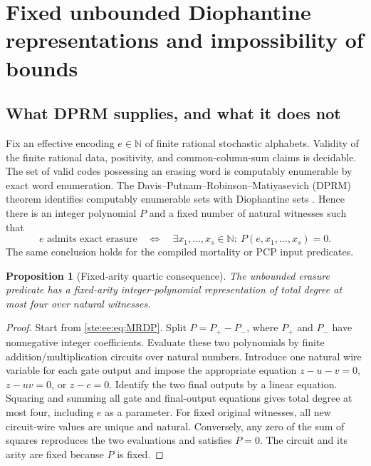 \documentclass[11pt,letterpaper]{article}
\newtheorem{proposition}[theorem]{Proposition}
\theoremstyle{definition}
\theoremstyle{remark}
\newcommand{\N}{\mathbb N}
\begin{document}
\section{Fixed unbounded Diophantine representations and impossibility of bounds}
\label{ste:ee:sec:unbounded}

\subsection{What DPRM supplies, and what it does not}

Fix an effective encoding $e\in\N$ of finite rational stochastic alphabets.
Validity of the finite rational data, positivity, and common-column-sum claims
is decidable. The set of valid codes possessing an erasing word is computably
enumerable by exact word enumeration. The Davis--Putnam--Robinson--Matiyasevich
(DPRM) theorem identifies computably enumerable sets with Diophantine sets
\cite{matiyasevich}. Hence there is an integer polynomial $P$ and a fixed number
of natural witnesses such that
\begin{equation}
 e\text{ admits exact erasure}\quad\Longleftrightarrow\quad
 \exists x_1,\ldots,x_s\in\N:\ P(e,x_1,\ldots,x_s)=0.
 \label{ste:ee:eq:MRDP}
\end{equation}
The same conclusion holds for the compiled mortality or PCP input predicates.

\begin{proposition}[Fixed-arity quartic consequence]\label{ste:ee:prop:fixedquartic}
The unbounded erasure predicate has a fixed-arity integer-polynomial
representation of total degree at most four over natural witnesses.
\end{proposition}
\begin{proof}
Start from \eqref{ste:ee:eq:MRDP}. Split $P=P_+-P_-$, where $P_+$ and $P_-$ have
nonnegative integer coefficients. Evaluate these two polynomials by finite
addition/multiplication circuits over natural numbers. Introduce one natural
wire variable for each gate output and impose the appropriate equation
$z-u-v=0$, $z-uv=0$, or $z-c=0$. Identify the two final outputs by a linear
equation. Squaring and summing all gate and final-output equations gives total
degree at most four, including $e$ as a parameter. For fixed original witnesses,
all new circuit-wire values are unique and natural. Conversely, any zero of the
sum of squares reproduces the two evaluations and satisfies $P=0$.
The circuit and its arity are fixed because $P$ is fixed.
\end{proof}
\end{document}
